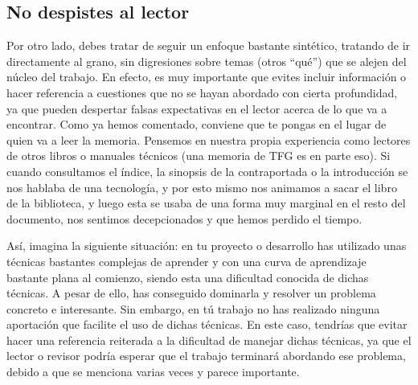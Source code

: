 \subsection{No despistes al lector}
Por otro lado, debes tratar de seguir un enfoque bastante sintético, tratando de ir directamente al grano, sin digresiones sobre temas (otros ``qué'') que se alejen del núcleo del trabajo. En efecto, es muy importante que evites incluir información o hacer referencia a cuestiones que no se hayan abordado con cierta profundidad, ya que pueden despertar falsas expectativas en el lector acerca de lo que va a encontrar. Como ya hemos comentado, conviene que te pongas en el lugar de quien va a leer la memoria. Pensemos en nuestra propia experiencia como lectores de otros libros o manuales técnicos (una memoria de TFG es en parte eso). Si cuando consultamos el índice, la sinopsis de la contraportada o la introducción se nos hablaba de una tecnología, y por esto mismo nos animamos a sacar el libro de la biblioteca, y luego esta se usaba de una forma muy marginal en el resto del documento, nos sentimos decepcionados y que hemos perdido el tiempo.

Así, imagina la siguiente situación: en tu proyecto o desarrollo has utilizado unas técnicas bastantes complejas de aprender y con una curva de aprendizaje bastante plana al comienzo, siendo esta una dificultad conocida de dichas técnicas. A pesar de ello, has conseguido dominarla y resolver un problema concreto e interesante. Sin embargo, en tú trabajo no has realizado ninguna aportación que facilite el uso de dichas técnicas. En este caso, tendrías que evitar hacer una referencia reiterada a la dificultad de manejar dichas técnicas, ya que el lector o revisor podría esperar que el trabajo terminará abordando ese problema, debido a que se menciona varias veces y parece importante.


